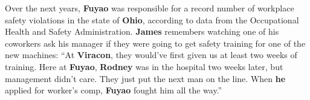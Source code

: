 \documentclass[12pt]{article}
\begin{document}
Over the next years, \textbf{Fuyao} was responsible for a record number of workplace safety violations in the state of \textbf{Ohio}, according to data from the Occupational Health and Safety Administration.  \textbf{James} remembers watching one of his coworkers ask his manager if they were going to get safety training for one of the new machines: ``At \textbf{Viracon}, they would've first given us at least two weeks of training. Here at \textbf{Fuyao}, \textbf{Rodney} was in the hospital two weeks later, but management didn't care. They just put the next man on the line. When \textbf{he} applied for worker's comp, \textbf{Fuyao} fought him all the way.''\\


\end{document}
